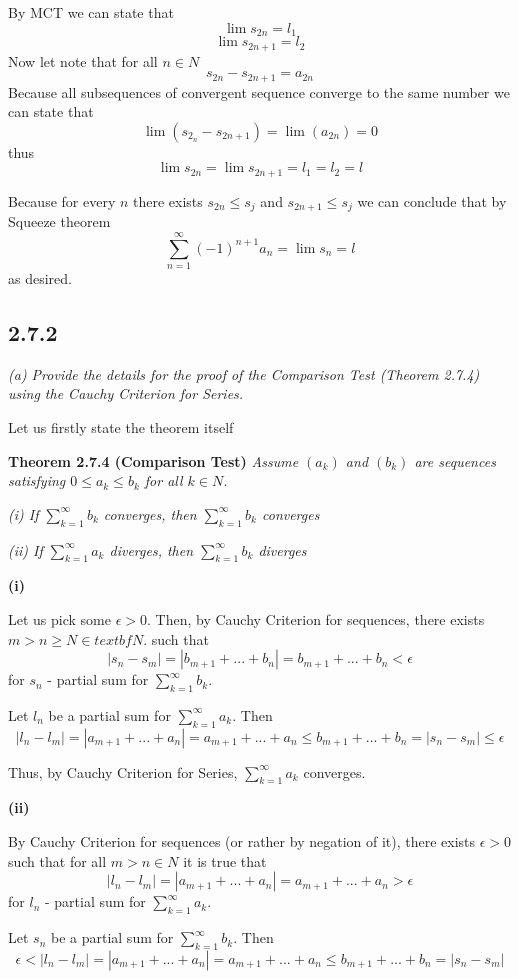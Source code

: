 \documentclass[11pt,oneside,titlepage]{book}
\begin{document}
By MCT we can state that 
$$\lim s_{2n} = l_1$$
$$\lim s_{2n + 1} = l_2 $$
Now let note that for all $n \in N$
$$s_{2n} - s_{2n + 1} = a_{2n}$$
Because all subsequences of convergent sequence converge to the same number
we can state that 
$$\lim(s_{2_n} - s_{2n + 1}) = \lim(a_{2n}) = 0$$
thus
$$\lim s_{2n} = \lim s_{2n + 1} = l_1 = l_2 = l$$

Because for every $n$ there exists $s_{2n} \leq s_j$ and
$s_{2n + 1} \leq s_j$
we can conclude that by Squeeze theorem
$$\sum_{n = 1}^{\infty} (-1)^{n + 1}a_n = \lim{s_n} = l$$
as desired.

\subsection*{2.7.2}
\textit{(a) Provide the details for the proof of the Comparison Test
  (Theorem 2.7.4) using the Cauchy Criterion for Series.}

Let us firstly state the theorem itself

\textbf{Theorem 2.7.4 (Comparison Test)}
\textit{Assume $(a_k)$ and $(b_k)$ are sequences satisfying
  $0 \leq a_k \leq b_k$ for all $k \in N$.}

\textit{(i) If $\sum^{\infty}_{k = 1}b_k$ converges,
  then $\sum^{\infty}_{k = 1}b_k$ converges}

\textit{(ii) If $\sum^{\infty}_{k = 1}a_k$ diverges,
  then $\sum^{\infty}_{k = 1}b_k$ diverges}

\textbf{ (i)}

Let us pick some $\epsilon > 0$. Then, by Cauchy Criterion for sequences,
there exists $m > n \geq N \in textbf{N}$.
such that 
$$|s_n - s_m| = |b_{m + 1} + ... + b_n| = b_{m + 1} + ... + b_n < \epsilon$$
for $s_n$ - partial sum for $\sum^{\infty}_{k = 1}b_k$.

Let $l_n$ be a partial sum for $\sum^{\infty}_{k = 1}a_k$. Then
$$|l_n - l_m| = |a_{m + 1} + ... + a_n| = a_{m + 1} + ... + a_n \leq
b_{m + 1} + ... + b_n = |s_n - s_m| \leq \epsilon$$

Thus, by Cauchy Criterion for Series,  $\sum^{\infty}_{k = 1}a_k$ converges.

\textbf{(ii)}

By Cauchy Criterion for sequences (or rather by negation of it),
there exists $\epsilon > 0$ such that 
for all  $m > n \in N$ it is true that 
$$|l_n - l_m| = |a_{m + 1} + ... + a_n| = a_{m + 1} + ... + a_n > \epsilon$$
for $l_n$ - partial sum for $\sum^{\infty}_{k = 1}a_k$.

Let $s_n$ be a partial sum for $\sum^{\infty}_{k = 1}b_k$. Then
$$\epsilon < |l_n - l_m| = |a_{m + 1} + ... + a_n| = a_{m + 1} + ... + a_n \leq
b_{m + 1} + ... + b_n = |s_n - s_m|$$
\end{document}
